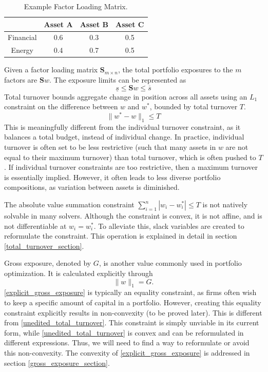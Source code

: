 \documentclass[11pt, letterpaper]{article}
\begin{document}
\begin{table}[h!]
\centering
\caption{Example Factor Loading Matrix.}
\label{example_attribute_matrix}
\begin{tabular}{|c|c|c|c|}
\hline
\textbf{} & \textbf{Asset A} & \textbf{Asset B} & \textbf{Asset C} \\ \hline
Financial & 0.6 & 0.3 & 0.5 \\ \hline
Energy & 0.4 & 0.7 & 0.5 \\ \hline
\end{tabular}
\end{table}

Given a factor loading matrix $\mathbf{S}_{m\times n}$, the total portfolio exposures to the $m$ factors are $\mathbf{S}w$. The
exposure limits can be represented as
\begin{equation}
    \underline{s} \leq \mathbf{S}w \leq \overline{s}
\end{equation}
Total turnover bounds aggregate change in position across all assets using an $L_1$ constraint on the difference
between $w$ and $w^*$, bounded by total turnover $T$.
\begin{equation}
    \label{unedited_total_turnover}
	\lVert w^* - w\rVert_1 \leq T
\end{equation}
This is meaningfully different from the individual turnover constraint, as it balances a total budget,
instead of individual change. In practice, individual turnover is often set to be less restrictive (such that many assets
in $w$ are not equal to their maximum turnover) than total turnover, which is often pushed to $T$. If individual turnover
constraints are too restrictive, then a maximum turnover is essentially implied. However, it often leads to less diverse
portfolio compositions, as variation between assets is diminished.

The absolute value summation constraint $\sum_{i=1}^{n} |w_i - w_i^*| \leq T$ is not natively solvable in many solvers.
Although the constraint is convex, it is not affine, and is not differentiable at $w_i = w_i^*$. To alleviate this, slack
variables are created to reformulate the constraint. This operation is explained in detail in section \ref{total_turnover_section}.

Gross exposure, denoted by $G$, is another value commonly used in portfolio optimization. It is calculated explicitly
through
\begin{equation}
    \label{explicit_gross_exposure}
	\lVert w\rVert_1 = G.
\end{equation}
\eqref{explicit_gross_exposure} is typically an equality constraint, as firms often wish to keep a specific amount of capital in a portfolio.
However, creating this equality constraint explicitly results in non-convexity (to be proved later). This is different
from \eqref{unedited_total_turnover}. This constraint is simply unviable in its current form, while \eqref{unedited_total_turnover}
is convex and can be reformulated in different expressions. Thus, we will need to find a way to reformulate or avoid this non-convexity.
The convexity of \eqref{explicit_gross_exposure} is addressed in section \ref{gross_exposure_section}.
\end{document}
